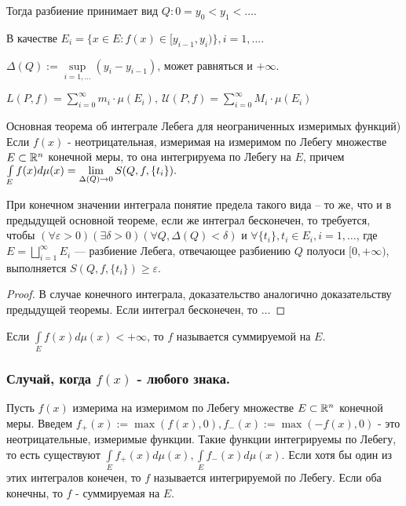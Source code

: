 Тогда разбиение принимает вид $Q: 0=y_0<y_1<\ldots$. 

В качестве $E_i = \{x\in E: f(x)\in[y_{i-1}, y_i)\}, i=1,\ldots$.

$\Delta(Q):=\sup\limits_{i=1, \ldots}(y_i-y_{i-1})$, может равняться и $+\infty$.

$L(P, f)=\sum\limits_{i=0}^{\infty}m_i\cdot \mu(E_i),\  \mathcal{U}(P, f)=\sum\limits_{i=0}^{\infty}M_i\cdot \mu(E_i)$ 

\begin{theorem}Основная теорема об интеграле Лебега для неограниченных измеримых функций)
Если $f(x)$ - неотрицательная, измеримая на измеримом по Лебегу множестве $E\subset \R^n$ конечной меры, то она интегрируема по Лебегу на $E$, причем
$\int\limits_E f(x)d\mu(x)\?=\lim\limits_{\Delta(Q)\to0}S(Q, f, \{t_i\}).$ 

При конечном значении интеграла понятие предела такого вида -- то же, что и в предыдущей основной теореме, если же интеграл бесконечен, то требуется, чтобы \newline$(\forall \varepsilon>0)( \exists \delta > 0)(\forall Q, \Delta(Q)<\delta) \text{ и } \forall \{t_i\}, t_i \in E_i, i=1,\ldots$, где $E=\bigsqcup\limits_{i=1}^{\infty} E_i$ --- разбиение Лебега, отвечающее разбиению $Q$ полуоси $[0, +\infty)$, выполняется $S(Q, f, \{t_i\})\geqslant\varepsilon$.
\end{theorem}

\begin{proof}
В случае конечного интеграла, доказательство аналогично доказательству предыдущей теоремы. Если интеграл бесконечен, то $\ldots$
\end{proof}

\begin{Def}
Если $\int\limits_E f(x)d\mu(x) < +\infty$, то $f$ называется суммируемой на $E$.
\end{Def}

\subsubsection{Случай, когда $f(x)$ - любого знака.}
Пусть $f(x)$ измерима на измеримом по Лебегу множестве $E \subset \R^n$ конечной меры. Введем $f_+(x):=\max(f(x), 0), f_-(x):=\max(-f(x), 0)$ - это неотрицательные, измеримые функции. Такие функции интегрируемы по Лебегу, то есть существуют $\int\limits_E f_+(x)d\mu(x), \int\limits_E f_-(x)d\mu(x)$. Если хотя бы один из этих интегралов конечен, то $f$ называется интегрируемой по Лебегу. Если оба конечны, то $f$ - суммируемая на $E$.



